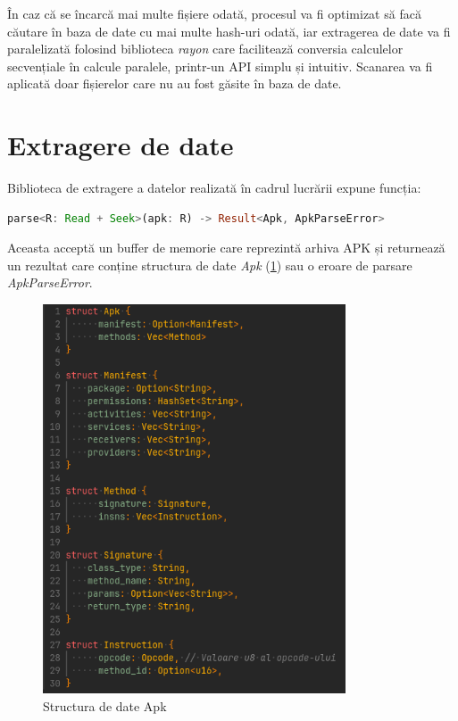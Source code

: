 \documentclass[12pt,a4paper]{report}
\begin{document}
În caz că se încarcă mai multe fișiere odată, procesul va fi optimizat să facă căutare în
baza de date cu mai multe hash-uri odată, iar extragerea de date va fi paralelizată folosind
biblioteca \textit{rayon}\cite{rayon} care facilitează conversia calculelor 
secvențiale în calcule paralele, printr-un API simplu și intuitiv. Scanarea va fi aplicată
doar fișierelor care nu au fost găsite în baza de date.


\section{Extragere de date}
Biblioteca de extragere a datelor realizată în cadrul lucrării expune funcția:
\begin{lstlisting}[language=Rust]
parse<R: Read + Seek>(apk: R) -> Result<Apk, ApkParseError>
\end{lstlisting}
Aceasta acceptă un buffer de memorie care reprezintă arhiva APK și returnează un rezultat
care conține structura de date \textit{Apk} (\cref{fig:apk_struct}) sau o eroare de parsare \textit{ApkParseError}.
\begin{figure}[H]
      \centering
      \includegraphics[width=0.8\textwidth]{visuals/structs.png}
      \caption{Structura de date Apk}
      \label{fig:apk_struct}
\end{figure}
\end{document}
